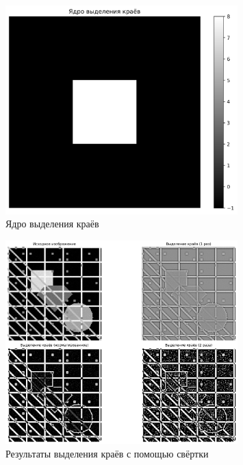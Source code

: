 \begin{figure}[H]
    \centering
    \includegraphics[width=0.8\textwidth]{images/task4/edge_kernel.png}
    \caption{Ядро выделения краёв}
    \label{fig:edge_kernel}
\end{figure}

\begin{figure}[H]
    \centering
    \includegraphics[width=0.8\textwidth]{images/task4/convolution_results.png}
    \caption{Результаты выделения краёв с помощью свёртки}
    \label{fig:convolution_edge}
\end{figure}

